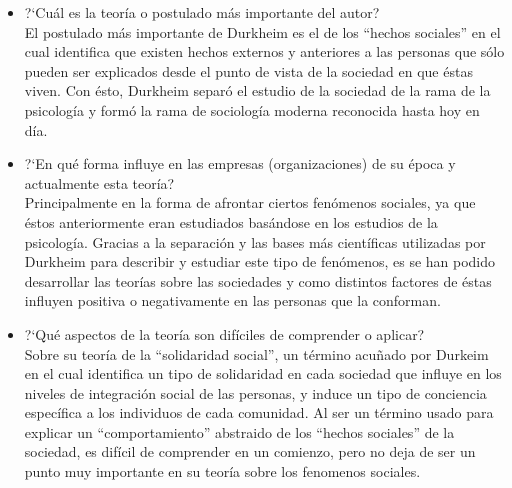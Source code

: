 \begin{itemize}
	\item ?`Cu\'al es la teor\'ia o postulado m\'as importante del autor?\\
	El postulado m\'as importante de Durkheim es el de los ``hechos sociales'' en el cual identifica que existen hechos externos y anteriores a las personas
	que s\'olo pueden ser explicados desde el punto de vista de la sociedad en que \'estas viven. Con \'esto, Durkheim separ\'o el estudio de la sociedad de la rama 
	de la psicolog\'ia y form\'o la rama de sociolog\'ia moderna reconocida hasta hoy en d\'ia.

	\item ?`En qu\'e forma influye en las empresas (organizaciones) de su \'epoca y actualmente esta teor\'ia?\\
	Principalmente en la forma de afrontar ciertos fen\'omenos sociales, ya que \'estos anteriormente eran estudiados bas\'andose en los estudios de la psicolog\'ia.
	Gracias a la separaci\'on y las bases m\'as cient\'ificas utilizadas por Durkheim para describir y estudiar este tipo de fen\'omenos, es se han podido desarrollar
	las teor\'ias sobre las sociedades y como distintos factores de \'estas influyen positiva o negativamente en las personas que la conforman.

	\item ?`Qu\'e aspectos de la teor\'ia son dif\'iciles de comprender o aplicar?\\
	Sobre su teor\'ia de la ``solidaridad social'', un t\'ermino acu\~nado por Durkeim en el cual identifica un tipo de solidaridad en cada sociedad que influye en los 
	niveles de integraci\'on social de las personas, y induce un tipo de conciencia espec\'ifica a los individuos de cada comunidad. Al ser un t\'ermino usado para 
	explicar un ``comportamiento'' abstraido de los ``hechos sociales'' de la sociedad, es dif\'icil de comprender en un comienzo, pero no deja de ser un punto muy 
	importante en su teor\'ia sobre los fenomenos sociales. 


\end{itemize}
